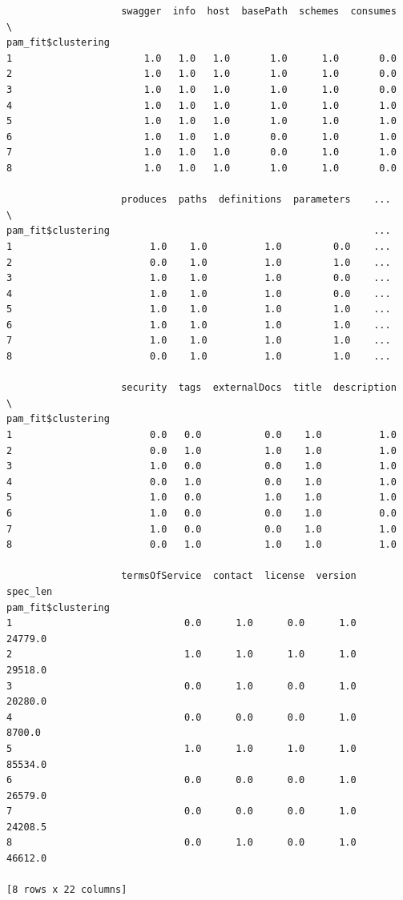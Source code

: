 \documentclass[11pt]{article}
\begin{document}
    
    \begin{verbatim}
                    swagger  info  host  basePath  schemes  consumes  \
pam_fit$clustering                                                     
1                       1.0   1.0   1.0       1.0      1.0       0.0   
2                       1.0   1.0   1.0       1.0      1.0       0.0   
3                       1.0   1.0   1.0       1.0      1.0       0.0   
4                       1.0   1.0   1.0       1.0      1.0       1.0   
5                       1.0   1.0   1.0       1.0      1.0       1.0   
6                       1.0   1.0   1.0       0.0      1.0       1.0   
7                       1.0   1.0   1.0       0.0      1.0       1.0   
8                       1.0   1.0   1.0       1.0      1.0       0.0   

                    produces  paths  definitions  parameters    ...     \
pam_fit$clustering                                              ...      
1                        1.0    1.0          1.0         0.0    ...      
2                        0.0    1.0          1.0         1.0    ...      
3                        1.0    1.0          1.0         0.0    ...      
4                        1.0    1.0          1.0         0.0    ...      
5                        1.0    1.0          1.0         1.0    ...      
6                        1.0    1.0          1.0         1.0    ...      
7                        1.0    1.0          1.0         1.0    ...      
8                        0.0    1.0          1.0         1.0    ...      

                    security  tags  externalDocs  title  description  \
pam_fit$clustering                                                     
1                        0.0   0.0           0.0    1.0          1.0   
2                        0.0   1.0           1.0    1.0          1.0   
3                        1.0   0.0           0.0    1.0          1.0   
4                        0.0   1.0           0.0    1.0          1.0   
5                        1.0   0.0           1.0    1.0          1.0   
6                        1.0   0.0           0.0    1.0          0.0   
7                        1.0   0.0           0.0    1.0          1.0   
8                        0.0   1.0           1.0    1.0          1.0   

                    termsOfService  contact  license  version  spec_len  
pam_fit$clustering                                                       
1                              0.0      1.0      0.0      1.0   24779.0  
2                              1.0      1.0      1.0      1.0   29518.0  
3                              0.0      1.0      0.0      1.0   20280.0  
4                              0.0      0.0      0.0      1.0    8700.0  
5                              1.0      1.0      1.0      1.0   85534.0  
6                              0.0      0.0      0.0      1.0   26579.0  
7                              0.0      0.0      0.0      1.0   24208.5  
8                              0.0      1.0      0.0      1.0   46612.0  

[8 rows x 22 columns]
    \end{verbatim}
\end{document}
